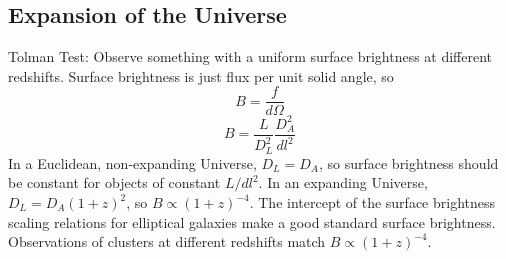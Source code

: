 \subsection{Expansion of the Universe}
Tolman Test:\newline
Observe something with a uniform surface brightness at different redshifts.  
Surface brightness is just flux per unit solid angle, so 
\begin{equation}
B=\frac{f}{d\Omega}
\end{equation}
\begin{equation}
B=\frac{L}{D_L^2}\frac{D_A^2}{dl^2}
\end{equation}
In a Euclidean, non-expanding Universe, $D_L=D_A$, so surface brightness should 
be constant for objects of constant $L/dl^2$.  In an expanding Universe, 
$D_L=D_A(1+z)^2$, so $B\propto(1+z)^{-4}$.  The intercept of the surface 
brightness scaling relations for elliptical galaxies make a good standard 
surface brightness.  Observations of clusters at different redshifts match 
$B\propto(1+z)^{-4}$.  


  
